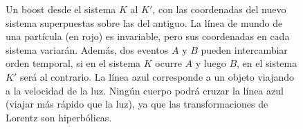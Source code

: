 \documentclass[]{article}
\numberwithin{equation}{section}
\begin{document}
\begin{figure}
	\caption{Un boost desde el sistema $K$ al $K'$, con las coordenadas del nuevo sistema superpuestas sobre las del antiguo. La línea de mundo de una partícula (en rojo) es invariable, pero sus coordenadas en cada sistema variarán. Además, dos eventos $A$ y $B$ pueden intercambiar orden temporal, si en el sistema $K$ ocurre $A$ y luego $B$, en el sistema $K'$ será al contrario. La línea azul corresponde a un objeto viajando a la velocidad de la luz. Ningún cuerpo podrá cruzar la línea azul (viajar más rápido que la luz), ya que las transformaciones de Lorentz son hiperbólicas.}
\end{figure}
\end{document}
